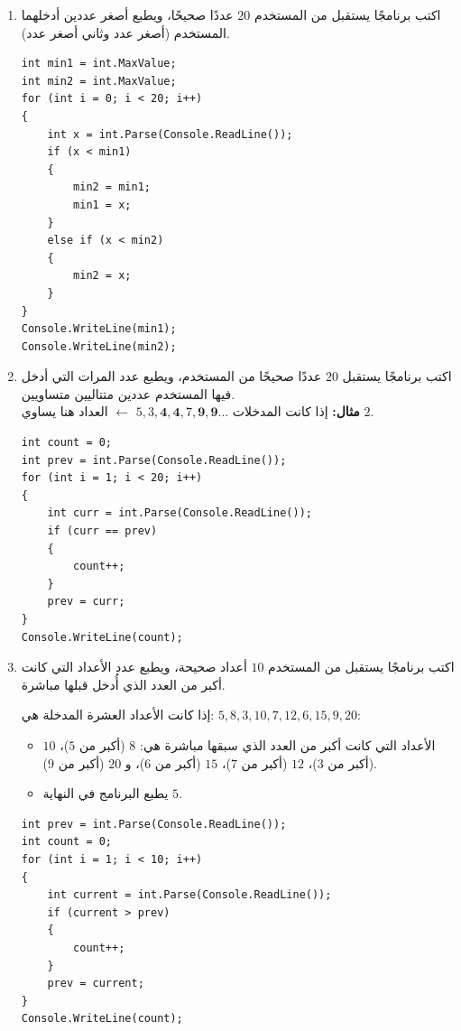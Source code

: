 \documentclass[14pt]{extarticle}
\begin{document}
\begin{enumerate}[resume, itemsep=2em]
\item اكتب برنامجًا يستقبل من المستخدم $20$ عددًا صحيحًا، ويطبع أصغر عددين أدخلهما المستخدم (أصغر عدد وثاني أصغر عدد).
\ifwithsols
\begin{boxSolution}
\begin{english}
\begin{verbatim}
int min1 = int.MaxValue;
int min2 = int.MaxValue;
for (int i = 0; i < 20; i++)
{
    int x = int.Parse(Console.ReadLine());
    if (x < min1)
    {
        min2 = min1;
        min1 = x;
    }
    else if (x < min2)
    {
        min2 = x;
    }
}
Console.WriteLine(min1);
Console.WriteLine(min2);
\end{verbatim}
\end{english}
\end{boxSolution}
\fi
\filbreak

\item اكتب برنامجًا يستقبل $20$ عددًا صحيحًا من المستخدم، ويطبع عدد المرات التي أدخل فيها المستخدم عددين متتاليين متساويين. \\
\textbf{مثال:} إذا كانت المدخلات $5, 3, \mathbf{4, 4}, 7, \mathbf{9, 9} \dots$ $\leftarrow$ العداد هنا يساوي $2$.
\ifwithsols
\begin{boxSolution}
\begin{english}
\begin{verbatim}
int count = 0;
int prev = int.Parse(Console.ReadLine());
for (int i = 1; i < 20; i++)
{
    int curr = int.Parse(Console.ReadLine());
    if (curr == prev)
    {
        count++;
    }
    prev = curr;
}
Console.WriteLine(count);
\end{verbatim}
\end{english}
\end{boxSolution}
\fi
\filbreak

\item اكتب برنامجًا يستقبل من المستخدم $10$ أعداد صحيحة، ويطبع عدد الأعداد التي كانت أكبر من العدد الذي أُدخل قبلها مباشرة.
\ifdetailed
\begin{boxExample}
إذا كانت الأعداد العشرة المدخلة هي: $5, 8, 3, 10, 7, 12, 6, 15, 9, 20$:
\begin{itemize}[nosep]
    \item الأعداد التي كانت أكبر من العدد الذي سبقها مباشرة هي: $8$ (أكبر من $5$)، $10$ (أكبر من $3$)، $12$ (أكبر من $7$)، $15$ (أكبر من $6$)، و $20$ (أكبر من $9$).
    \item يطبع البرنامج في النهاية $5$.
\end{itemize}
\end{boxExample}
\fi
\ifwithsols
\begin{boxSolution}
\begin{english}
\begin{verbatim}
int prev = int.Parse(Console.ReadLine());
int count = 0;
for (int i = 1; i < 10; i++)
{
    int current = int.Parse(Console.ReadLine());
    if (current > prev)
    {
        count++;
    }
    prev = current;
}
Console.WriteLine(count);
\end{verbatim}
\end{english}
\end{boxSolution}
\fi
\filbreak


\end{enumerate}
\end{document}
